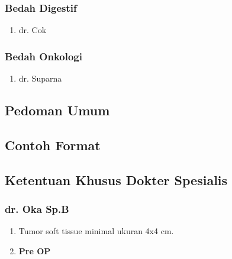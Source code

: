 \documentclass[
]{book}
\providecommand{\tightlist}{%
  \setlength{\itemsep}{0pt}\setlength{\parskip}{0pt}}
\begin{document}
\hypertarget{bedah-digestif}{%
\subsubsection{Bedah Digestif}\label{bedah-digestif}}

\begin{enumerate}
\def\labelenumi{\arabic{enumi}.}
\tightlist
\item
  dr. Cok
\end{enumerate}

\hypertarget{bedah-onkologi}{%
\subsubsection{Bedah Onkologi}\label{bedah-onkologi}}

\begin{enumerate}
\def\labelenumi{\arabic{enumi}.}
\tightlist
\item
  dr. Suparna
\end{enumerate}

\hypertarget{pedoman-umum-3}{%
\subsection{Pedoman Umum}\label{pedoman-umum-3}}

\hypertarget{contoh-format-3}{%
\subsection{Contoh Format}\label{contoh-format-3}}

\hypertarget{ketentuan-khusus-dokter-spesialis-2}{%
\subsection{Ketentuan Khusus Dokter Spesialis}\label{ketentuan-khusus-dokter-spesialis-2}}

\hypertarget{dr.-oka-sp.b}{%
\subsubsection{dr. Oka Sp.B}\label{dr.-oka-sp.b}}

\begin{enumerate}
\def\labelenumi{\arabic{enumi}.}
\tightlist
\item
  Tumor soft tissue minimal ukuran 4x4 cm.
\item
  \textbf{Pre OP}
\end{enumerate}
\end{document}
